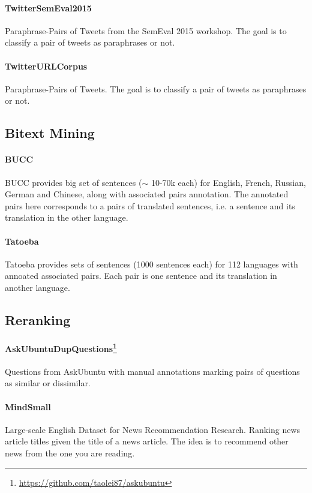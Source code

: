 \documentclass[11pt]{article}
\begin{document}
\paragraph{TwitterSemEval2015} \cite{xu2015semeval} Paraphrase-Pairs of Tweets from the SemEval 2015 workshop. The goal is to classify a pair of tweets as paraphrases or not.

\paragraph{TwitterURLCorpus} \cite{lan2017sentential} Paraphrase-Pairs of Tweets. The goal is to classify a pair of tweets as paraphrases or not.

\subsection{Bitext Mining}

\paragraph{BUCC} \cite{zweigenbaum2016bucc1, zweigenbaum2017bucc2, zweigenbaum2018bucc3} BUCC provides big set of sentences ($\sim$ 10-70k each) for English, French, Russian, German and Chinese, along with associated pairs annotation. The annotated pairs here corresponds to a pairs of translated sentences, i.e. a sentence and its translation in the other language.

\paragraph{Tatoeba} \cite{tatoeba} Tatoeba provides sets of sentences (1000 sentences each) for 112 languages with annoated associated pairs. Each pair is one sentence and its translation in another language.

\subsection{Reranking}

\paragraph{AskUbuntuDupQuestions\footnote{\url{https://github.com/taolei87/askubuntu}}} Questions from AskUbuntu with manual annotations marking pairs of questions as similar or dissimilar.

\paragraph{MindSmall}\cite{wu2020mind} Large-scale English Dataset for News Recommendation Research. Ranking news article titles given the title of a news article. The idea is to recommend other news from the one you are reading.
\end{document}
